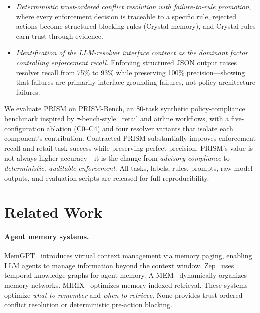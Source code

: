 \documentclass[11pt]{article}
\begin{document}
\begin{itemize}
\item \emph{Deterministic trust-ordered conflict resolution with failure-to-rule promotion},
      where every enforcement decision is traceable to a specific rule,
      rejected actions become structured blocking rules (Crystal memory),
      and Crystal rules earn trust through evidence.
\item \emph{Identification of the LLM-resolver interface contract as the dominant factor
      controlling enforcement recall.} Enforcing structured JSON output raises
      resolver recall from 75\% to 93\% while preserving 100\% precision---showing
      that failures are primarily interface-grounding failures, not policy-architecture failures.
\end{itemize}

We evaluate PRISM on PRISM-Bench, an 80-task synthetic policy-compliance benchmark
inspired by $\tau$-bench-style~\cite{yao2024taubench} retail and airline workflows,
with a five-configuration ablation (C0--C4) and four resolver variants
that isolate each component's contribution.
Contracted PRISM substantially improves enforcement recall and retail task
success while preserving perfect precision.
PRISM's value is not always higher accuracy---it is the change from
\emph{advisory compliance} to \emph{deterministic, auditable enforcement}.
All tasks, labels, rules, prompts, raw model outputs, and evaluation scripts are
released for full reproducibility.

\section{Related Work}
\label{sec:related}

\paragraph{Agent memory systems.}
MemGPT~\cite{packer2023memgpt} introduces virtual context management via memory paging,
enabling LLM agents to manage information beyond the context window.
Zep~\cite{zep2024} uses temporal knowledge graphs for agent memory.
A-MEM~\cite{amem2024} dynamically organizes memory networks.
MIRIX~\cite{mirix2024} optimizes memory-indexed retrieval.
These systems optimize \emph{what to remember} and \emph{when to retrieve}.
None provides trust-ordered conflict resolution or deterministic pre-action blocking.
\end{document}
